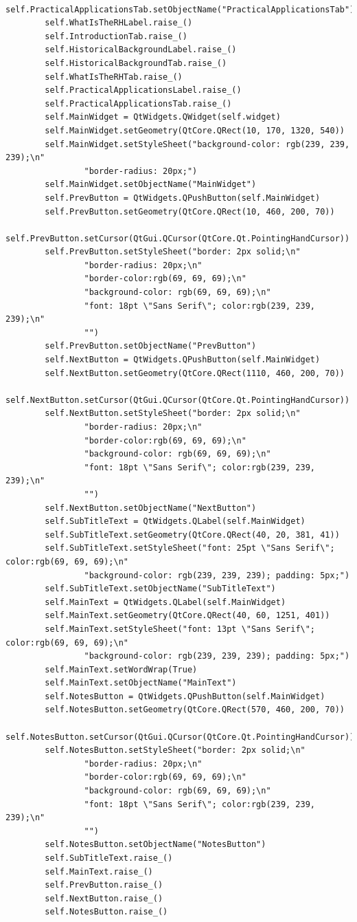 \documentclass{article}
\begin{document}
\begin{lstlisting}
        self.PracticalApplicationsTab.setObjectName("PracticalApplicationsTab")
        self.WhatIsTheRHLabel.raise_()
        self.IntroductionTab.raise_()
        self.HistoricalBackgroundLabel.raise_()
        self.HistoricalBackgroundTab.raise_()
        self.WhatIsTheRHTab.raise_()
        self.PracticalApplicationsLabel.raise_()
        self.PracticalApplicationsTab.raise_()
        self.MainWidget = QtWidgets.QWidget(self.widget)
        self.MainWidget.setGeometry(QtCore.QRect(10, 170, 1320, 540))
        self.MainWidget.setStyleSheet("background-color: rgb(239, 239, 239);\n"
                "border-radius: 20px;")
        self.MainWidget.setObjectName("MainWidget")
        self.PrevButton = QtWidgets.QPushButton(self.MainWidget)
        self.PrevButton.setGeometry(QtCore.QRect(10, 460, 200, 70))
        self.PrevButton.setCursor(QtGui.QCursor(QtCore.Qt.PointingHandCursor))
        self.PrevButton.setStyleSheet("border: 2px solid;\n"
                "border-radius: 20px;\n"
                "border-color:rgb(69, 69, 69);\n"
                "background-color: rgb(69, 69, 69);\n"
                "font: 18pt \"Sans Serif\"; color:rgb(239, 239, 239);\n"
                "")
        self.PrevButton.setObjectName("PrevButton")
        self.NextButton = QtWidgets.QPushButton(self.MainWidget)
        self.NextButton.setGeometry(QtCore.QRect(1110, 460, 200, 70))
        self.NextButton.setCursor(QtGui.QCursor(QtCore.Qt.PointingHandCursor))
        self.NextButton.setStyleSheet("border: 2px solid;\n"
                "border-radius: 20px;\n"
                "border-color:rgb(69, 69, 69);\n"
                "background-color: rgb(69, 69, 69);\n"
                "font: 18pt \"Sans Serif\"; color:rgb(239, 239, 239);\n"
                "")
        self.NextButton.setObjectName("NextButton")
        self.SubTitleText = QtWidgets.QLabel(self.MainWidget)
        self.SubTitleText.setGeometry(QtCore.QRect(40, 20, 381, 41))
        self.SubTitleText.setStyleSheet("font: 25pt \"Sans Serif\"; color:rgb(69, 69, 69);\n"
                "background-color: rgb(239, 239, 239); padding: 5px;")
        self.SubTitleText.setObjectName("SubTitleText")
        self.MainText = QtWidgets.QLabel(self.MainWidget)
        self.MainText.setGeometry(QtCore.QRect(40, 60, 1251, 401))
        self.MainText.setStyleSheet("font: 13pt \"Sans Serif\"; color:rgb(69, 69, 69);\n"
                "background-color: rgb(239, 239, 239); padding: 5px;")
        self.MainText.setWordWrap(True)
        self.MainText.setObjectName("MainText")
        self.NotesButton = QtWidgets.QPushButton(self.MainWidget)
        self.NotesButton.setGeometry(QtCore.QRect(570, 460, 200, 70))
        self.NotesButton.setCursor(QtGui.QCursor(QtCore.Qt.PointingHandCursor))
        self.NotesButton.setStyleSheet("border: 2px solid;\n"
                "border-radius: 20px;\n"
                "border-color:rgb(69, 69, 69);\n"
                "background-color: rgb(69, 69, 69);\n"
                "font: 18pt \"Sans Serif\"; color:rgb(239, 239, 239);\n"
                "")
        self.NotesButton.setObjectName("NotesButton")
        self.SubTitleText.raise_()
        self.MainText.raise_()
        self.PrevButton.raise_()
        self.NextButton.raise_()
        self.NotesButton.raise_()


\end{lstlisting}
\end{document}
